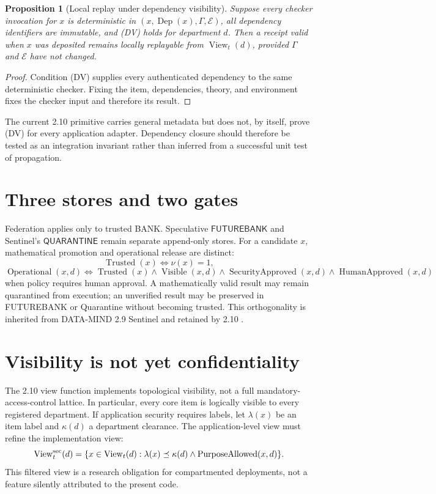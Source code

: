 \documentclass[11pt,oneside]{book}
\newtheorem{proposition}[theorem]{Proposition}
\theoremstyle{definition}
\theoremstyle{remark}
\newcommand{\FB}{\mathsf{FUTUREBANK}}
\newcommand{\Dep}{\operatorname{Dep}}
\newcommand{\QUAR}{\mathsf{QUARANTINE}}
\newcommand{\View}{\operatorname{View}}
\begin{document}
\begin{proposition}[Local replay under dependency visibility]
Suppose every checker invocation for \(x\) is deterministic in \((x,\Dep(x),\Gamma,\mathcal E)\),
all dependency identifiers are immutable, and (DV) holds for department \(d\). Then a receipt valid
when \(x\) was deposited remains locally replayable from \(\View_t(d)\), provided \(\Gamma\) and
\(\mathcal E\) have not changed.
\end{proposition}

\begin{proof}
Condition (DV) supplies every authenticated dependency to the same deterministic checker. Fixing the
item, dependencies, theory, and environment fixes the checker input and therefore its result.
\end{proof}

The current 2.10 primitive carries general metadata but does not, by itself, prove (DV) for every
application adapter. Dependency closure should therefore be tested as an integration invariant rather
than inferred from a successful unit test of propagation.

\section{Three stores and two gates}
Federation applies only to trusted BANK. Speculative \(\FB\) and Sentinel's \(\QUAR\) remain
separate append-only stores. For a candidate \(x\), mathematical promotion and operational release
are distinct:
\[
\operatorname{Trusted}(x)\iff \nu(x)=1,
\]
\[
\operatorname{Operational}(x,d)
\iff \operatorname{Trusted}(x)\land
\operatorname{Visible}(x,d)\land
\operatorname{SecurityApproved}(x,d)\land
\operatorname{HumanApproved}(x,d)
\]
when policy requires human approval. A mathematically valid result may remain quarantined from
execution; an unverified result may be preserved in FUTUREBANK or Quarantine without becoming
trusted. This orthogonality is inherited from DATA-MIND 2.9 Sentinel and retained by 2.10
\cite{DataMind29ADR}.

\section{Visibility is not yet confidentiality}
The 2.10 view function implements topological visibility, not a full mandatory-access-control lattice.
In particular, every core item is logically visible to every registered department. If application
security requires labels, let \(\lambda(x)\) be an item label and \(\kappa(d)\) a department clearance.
The application-level view must refine the implementation view:
\[
\View_t^{\rm sec}(d)=
\{x\in\View_t(d):\lambda(x)\preceq\kappa(d)\land
\operatorname{PurposeAllowed}(x,d)\}.
\]
This filtered view is a research obligation for compartmented deployments, not a feature silently
attributed to the present code.
\end{document}
